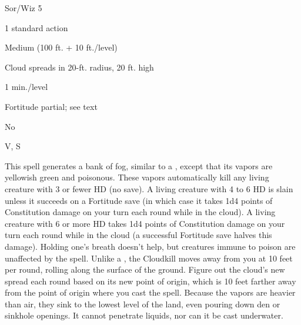 
\begin{description*}
\item[Level:] Sor/Wiz 5
\item[Casting Time:] 1 standard action
\item[Range:] Medium (100 ft. + 10 ft./level)
\item[Effect:] Cloud spreads in 20-ft. radius, 20 ft. high
\item[Duration:] 1 min./level
\item[Saving Throw:] Fortitude partial; see text
\item[Spell Resistance:] No
\item[Components:] V, S
\end{description*}

This spell generates a bank of fog, similar to a , except that
its vapors are yellowish green and poisonous. These vapors automatically kill any
living creature with 3 or fewer HD (no save). A living creature with 4 to 6 HD
is slain unless it succeeds on a Fortitude save (in which case it takes 1d4 points
of Constitution damage on your turn each round while in the cloud).
A living creature with 6 or more HD takes 1d4 points of Constitution damage on
your turn each round while in the cloud (a successful Fortitude save halves this
damage). Holding one's breath doesn't help, but creatures immune to poison are
unaffected by the spell.
Unlike a , the Cloudkill moves away from you at 10 feet
per round, rolling along the surface of the ground.
Figure out the cloud's new spread each round based on its new point of origin,
which is 10 feet farther away from the point of origin where you cast the spell.
Because the vapors are heavier than air, they sink to the lowest level of the land,
even pouring down den or sinkhole openings. It cannot penetrate liquids, nor can
it be cast underwater.